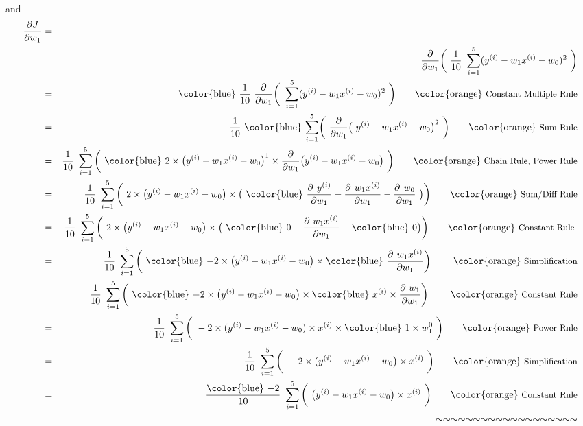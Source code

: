 \documentclass[12pt]{article}
\newcommand{\afmod}[1]{\text{{\color{blue} \textbf{$#1$}}}}
\newcommand{\qtext}[1]{\qquad \text{{\color{orange} \small{#1}}}}
\begin{document}
\vspace{4mm} \\
\noindent and
\vspace{3mm} \\

\begin{eqnarray*}
\frac{\partial J}{\partial w_1} & = &  \\
& = & \frac{\partial}{\partial w_1} \bigg(\ \frac{1}{10} \ \sum_{i=1}^{5} (y^{(i)} - w_1x^{(i)} - w_0)^2\ \bigg) \\
& = & \afmod{\frac{1}{10}} \ \frac{\partial}{\partial w_1} \bigg(\  \sum_{i=1}^{5} (y^{(i)} - w_1x^{(i)} - w_0)^2\ \bigg)
 \qtext{Constant Multiple Rule} \\
& = & \frac{1}{10} \ \afmod{\sum_{i=1}^{5}} \bigg(\ \frac{\partial}{\partial w_1} \big(\ y^{(i)} - w_1x^{(i)} - w_0\big)^2\ \bigg) \qtext{Sum Rule} \\
& = & \frac{1}{10} \ \sum_{i=1}^{5} \bigg(\ \afmod{2 \times \big(y^{(i)} - w_1x^{(i)} - w_0 \big)^1 \times \frac{\partial}{\partial w_1} \big(y^{(i)} - w_1x^{(i)} - w_0 \big)}\ \bigg) \qtext{Chain Rule, Power Rule} \\
& = & \frac{1}{10} \ \sum_{i=1}^{5} \bigg(\ 2 \times \big(y^{(i)}-w_1x^{(i)}-w_0 \big) \times \big(\ \afmod{\frac{\partial\ y^{(i)}}{\partial w_1} - \frac{\partial\ w_1x^{(i)}}{\partial w_1} - \frac{\partial\ w_0}{\partial w_1}} \ \big) \bigg) \qtext{Sum/Diff Rule} \\
& = & \frac{1}{10} \ \sum_{i=1}^{5} \bigg(\ 2 \times \big(y^{(i)} - w_1x^{(i)} - w_0 \big) \times \big(\ \afmod{0} - \frac{\partial\ w_1x^{(i)}}{\partial w_1} - \afmod{0} \big) \bigg) \qtext{Constant Rule } \\
& = & \frac{1}{10} \ \sum_{i=1}^{5} \bigg(\ \afmod{-}2 \times \big( y^{(i)} - w_1x^{(i)} - w_0 \big) \times \afmod{\frac{\partial\ w_1x^{(i)}}{\partial w_1}}\bigg)\ \qtext{Simplification} \\
& = & \frac{1}{10} \ \sum_{i=1}^{5} \bigg(\ \afmod{-}2 \times \big( y^{(i)} - w_1x^{(i)} - w_0 \big) \times \afmod{x^{(i)}} \times \frac{\partial\ w_1}{\partial w_1}\bigg)\ \qtext{Constant Rule} \\
& = & \frac{1}{10} \ \sum_{i=1}^{5} \bigg(\ -2 \times (y^{(i)} - w_1x^{(i)} - w_0) \times x^{(i)} \times \afmod{1 \times w_1^0} \ \bigg) \qtext{Power Rule} \\
& = & \frac{1}{10} \ \sum_{i=1}^{5} \bigg(\ -2 \times (y^{(i)} - w_1x^{(i)} - w_0 \big) \times x^{(i)} \ \bigg) \qtext{Simplification} \\
& = & \frac{\afmod{-2}}{10} \ \sum_{i=1}^{5} \bigg( \ \big( y^{(i)} - w_1x^{(i)} - w_0 \big) \times x^{(i)} \ \bigg) \qtext{Constant Rule}\\
& & \quad \sim \sim \sim \sim \sim \sim \sim \sim \sim \sim \sim \sim \sim \sim \sim \sim \sim \sim \sim \\  
\end{eqnarray*} 
 
\end{document}
